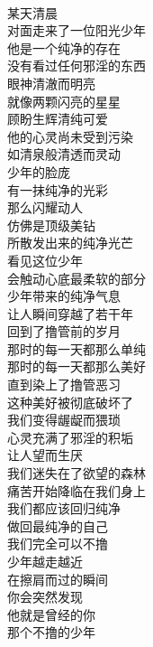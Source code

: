 \begin{poem}[遇见最纯净的自己]
    \begin{multicols}{3}
        \centering~\\
        某天清晨 \\ 对面走来了一位阳光少年 \\ 他是一个纯净的存在 \\ 没有看过任何邪淫的东西 \\ 眼神清澈而明亮 \\ 就像两颗闪亮的星星 \\ 顾盼生辉清纯可爱 \\ 他的心灵尚未受到污染 \\ 如清泉般清透而灵动 \\ 少年的脸庞 \\ 有一抹纯净的光彩 \\ 那么闪耀动人 \\ 仿佛是顶级美钻 \\ 所散发出来的纯净光芒 \\ 看见这位少年 \\ 会触动心底最柔软的部分 \\ 少年带来的纯净气息 \\ 让人瞬间穿越了若干年 \\ 回到了撸管前的岁月 \\ 那时的每一天都那么单纯 \\ 那时的每一天都那么美好 \\ 直到染上了撸管恶习 \\ 这种美好被彻底破坏了 \\ 我们变得龌龊而猥琐 \\ 心灵充满了邪淫的积垢 \\ 让人望而生厌 \\ 我们迷失在了欲望的森林 \\ 痛苦开始降临在我们身上 \\ 我们都应该回归纯净 \\ 做回最纯净的自己 \\ 我们完全可以不撸 \\ 少年越走越近 \\ 在擦肩而过的瞬间 \\ 你会突然发现 \\ 他就是曾经的你 \\ 那个不撸的少年
    \end{multicols}
\end{poem}
